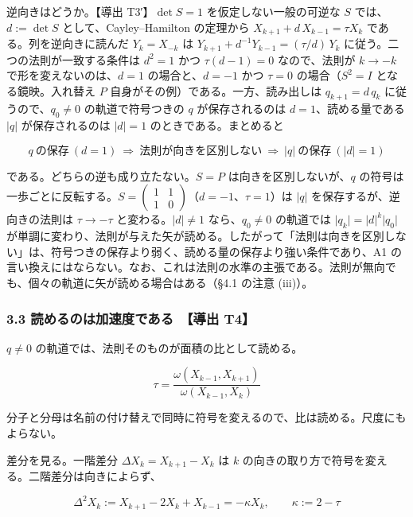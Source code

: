 \documentclass[
  a4paper,
]{ltjsarticle}
\begin{document}
逆向きはどうか。【導出 T3′】\(\det S=1\) を仮定しない一般の可逆な \(S\)
では、\(d:=\det S\) として、Cayley--Hamilton の定理から
\(X_{k+1}+d\,X_{k-1}=\tau X_k\) である。列を逆向きに読んだ
\(Y_k=X_{-k}\) は \(Y_{k+1}+d^{-1}Y_{k-1}=(\tau/d)\,Y_k\)
に従う。二つの法則が一致する条件は \(d^2=1\) かつ \(\tau(d-1)=0\)
なので、法則が \(k\to-k\) で形を変えないのは、\(d=1\) の場合と、\(d=-1\)
かつ \(\tau=0\) の場合（\(S^2=I\) となる鏡映。入れ替え \(P\)
自身がその例）である。一方、読み出しは \(q_{k+1}=d\,q_k\)
に従うので、\(q_0\neq0\) の軌道で符号つきの \(q\) が保存されるのは
\(d=1\)、読める量である \(\lvert q\rvert\) が保存されるのは
\(\lvert d\rvert=1\) のときである。まとめると

\[
\boxed{\;q\ \text{の保存}\ (d=1)\ \Longrightarrow\ \text{法則が向きを区別しない}\ \Longrightarrow\ \lvert q\rvert\ \text{の保存}\ (\lvert d\rvert=1)\;}
\]

である。どちらの逆も成り立たない。\(S=P\) は向きを区別しないが、\(q\)
の符号は一歩ごとに反転する。\(S=\begin{pmatrix}1&1\\1&0\end{pmatrix}\)（\(d=-1\)、\(\tau=1\)）は
\(\lvert q\rvert\) を保存するが、逆向きの法則は \(\tau\to-\tau\)
と変わる。\(\lvert d\rvert\neq1\) なら、\(q_0\neq0\) の軌道では
\(\lvert q_k\rvert=\lvert d\rvert^k\lvert q_0\rvert\)
が単調に変わり、法則が与えた矢が読める。したがって「法則は向きを区別しない」は、符号つきの保存より弱く、読める量の保存より強い条件であり、A1
の言い換えにはならない。なお、これは法則の水準の主張である。法則が無向でも、個々の軌道に矢が読める場合はある（§4.1
の注意 (iii)）。

\subsubsection{3.3 読めるのは加速度である　【導出
T4】}\label{ux8aadux3081ux308bux306eux306fux52a0ux901fux5ea6ux3067ux3042ux308b-ux5c0eux51fa-t4}

\(q\neq0\) の軌道では、法則そのものが面積の比として読める。

\[
\tau=\frac{\omega(X_{k-1},X_{k+1})}{\omega(X_{k-1},X_k)}
\]

分子と分母は名前の付け替えで同時に符号を変えるので、比は読める。尺度にもよらない。

差分を見る。一階差分 \(\Delta X_k=X_{k+1}-X_k\) は \(k\)
の向きの取り方で符号を変える。二階差分は向きによらず、

\[
\boxed{\;\Delta^2X_k:=X_{k+1}-2X_k+X_{k-1}=-\kappa X_k,\qquad\kappa:=2-\tau\;}
\]
\end{document}

